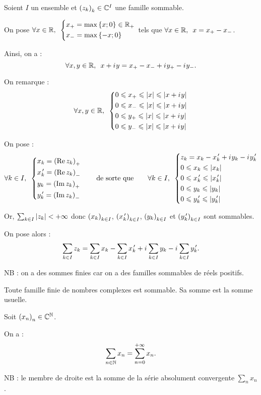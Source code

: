 \begin{defi}
Soient \(I\) un ensemble et \(\left(z_k\right)_k\in\mathbb{C}^I\) une famille sommable.

On pose \(\quantifs{\forall x\in\R}\begin{dcases}
x_+=\max\accol{x;0}\in\Rp \\
x_-=\max\accol{-x;0}
\end{dcases}\) tels que \(\quantifs{\forall x\in\R}x=x_+-x_-\).

Ainsi, on a : \[\quantifs{\forall x,y\in\R}x+\i y=x_+-x_-+\i y_+-\i y_-.\]

On remarque : \[\quantifs{\forall x,y\in\R}\begin{dcases}
0\leq x_+\leq\abs{x}\leq\abs{x+\i y} \\
0\leq x_-\leq\abs{x}\leq\abs{x+\i y} \\
0\leq y_+\leq\abs{x}\leq\abs{x+\i y} \\
0\leq y_-\leq\abs{x}\leq\abs{x+\i y}
\end{dcases}\]

On pose : \[\quantifs{\forall k\in I}\begin{dcases}
x_k=\paren{\Re z_k}_+ \\
x_k\prim=\paren{\Re z_k}_- \\
y_k=\paren{\Im z_k}_+ \\
y_k\prim=\paren{\Im z_k}_-
\end{dcases}\qquad\text{de sorte que}\qquad\quantifs{\forall k\in I}\begin{dcases}
z_k=x_k-x_k\prim+\i y_k-\i y_k\prim \\
0\leq x_k\leq\abs{x_k} \\
0\leq x_k\prim\leq\abs{x_k\prim} \\
0\leq y_k\leq\abs{y_k} \\
0\leq y_k\prim\leq\abs{y_k\prim}
\end{dcases}\]

Or, \(\sum_{k\in I}\left\lvert z_k\right\rvert<+\infty\) donc \(\left(x_k\right)_{k\in I}\), \(\left(x_k^{\,\prime}\right)_{k\in I}\), \(\left(y_k\right)_{k\in I}\) et \(\left(y_k^{\,\prime}\right)_{k\in I}\) sont sommables.

On pose alors : \[\sum_{k\in I}z_k=\sum_{k\in I}x_k-\sum_{k\in I}x_k^{\,\prime}+i\mkern1mu\sum_{k\in I}y_k-i\mkern1mu\sum_{k\in I}y_k^{\,\prime}.\]

NB : on a des sommes finies car on a des familles sommables de réels positifs.
\end{defi}

\begin{ex}
Toute famille finie de nombres complexes est sommable. Sa somme est la somme usuelle.
\end{ex}

\begin{ex}
Soit \(\left(x_n\right)_n\in\mathbb{C}^{\mathbb{N}}\).

On a : \[\sum_{n\in\mathbb{N}}x_n=\sum_{n=0}^{+\infty}x_n.\]

NB : le membre de droite est la somme de la série absolument convergente \(\sum_nx_n\).
\end{ex}